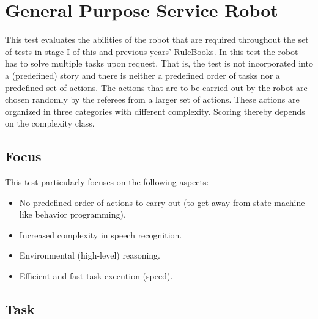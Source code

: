 \section{General Purpose Service Robot}

%
%
This test evaluates the abilities of the robot that are required throughout the set of tests in stage I of this and previous years' RuleBooks. In this test the robot has to solve multiple tasks upon request. That is, the test is not incorporated into a (predefined) story and there is neither a predefined order of tasks nor a predefined set of actions. The actions that are to be carried out by the robot are chosen randomly by the referees from a larger set of actions. These actions are organized in three categories with different complexity. Scoring thereby depends on the complexity class.

%
%
\subsection{Focus}
This test particularly focuses on the following aspects:
\begin{itemize}
	\item No predefined order of actions to carry out (to get away from state machine-like behavior programming).
	\item Increased complexity in speech recognition.
	\item Environmental (high-level) reasoning.
	\item Efficient and fast task execution (speed).
\end{itemize}


%
%
%
\subsection{Task}

